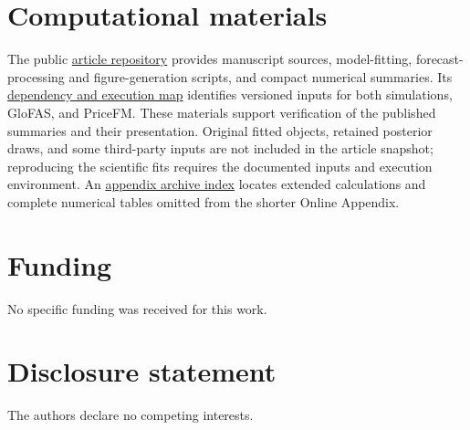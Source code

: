 \documentclass[12pt,letterpaper]{article}
\newif\ifQdesnAnonymous
\numberwithin{equation}{section}
\begin{document}
\section*{Computational materials}
\ifQdesnAnonymous
The reproducibility materials comprise manuscript sources, analysis scripts,
configuration records, and the tabulated evidence used in the figures.
Large fitted objects and third-party inputs are not included in the article
source bundle.
\else
The public
\href{https://github.com/AntonioAPDL/Article-Q-DESN---Version-2}{article repository}
provides manuscript sources, model-fitting, forecast-processing and
figure-generation scripts, and compact numerical
summaries. Its
\href{https://github.com/AntonioAPDL/Article-Q-DESN---Version-2/blob/main/docs/reproducibility/article_dependency_and_execution_map.md}{dependency and execution map}
identifies versioned inputs for both simulations, GloFAS, and PriceFM.
These materials support verification of the published summaries and their
presentation. Original fitted objects, retained posterior draws, and some
third-party inputs are not included in the article snapshot; reproducing the
scientific fits requires the documented inputs and execution environment.
An
\href{https://github.com/AntonioAPDL/Article-Q-DESN---Version-2/blob/main/docs/reproducibility/appendix_essential_archive_20261106.md}{appendix archive index}
locates extended calculations and complete numerical tables omitted from the
shorter Online Appendix.

\section*{Funding}
No specific funding was received for this work.

\section*{Disclosure statement}
The authors declare no competing interests.
\fi



\end{document}
